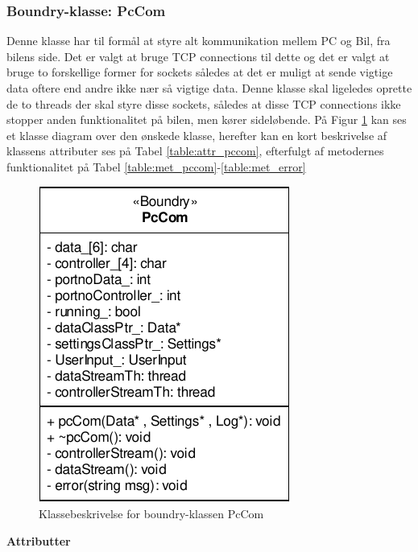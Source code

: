 \subsubsection{Boundry-klasse: PcCom}

Denne klasse har til formål at styre alt kommunikation mellem PC og Bil, fra bilens side. Det er valgt at bruge TCP connections til dette og det er valgt at bruge to forskellige former for sockets således at det er muligt at sende vigtige data oftere end andre ikke nær så vigtige data. Denne klasse skal ligeledes oprette de to threads der skal styre disse sockets, således at disse TCP connections ikke stopper anden funktionalitet på bilen, men kører sideløbende. På Figur \ref{fig:cd_pccom} kan ses et klasse diagram over den ønskede klasse, herefter kan en kort beskrivelse af klassens attributer ses på Tabel \ref{table:attr_pccom}, efterfulgt af metodernes funktionalitet på Tabel \ref{table:met_pccom}-\ref{table:met_error}

\begin{figure}[h]
\centering
\includegraphics[]{../fig/diagrammer/bil/cd_pccom.pdf}
\caption{Klassebeskrivelse for boundry-klassen PcCom}
\label{fig:cd_pccom}
\end{figure}

\clearpage

\textbf{Attributter}

